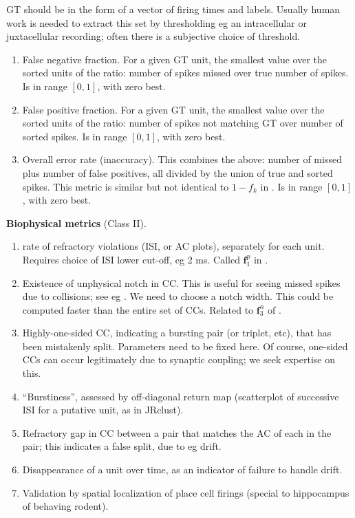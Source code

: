 \documentclass[10pt]{article}
\newcommand{\ben}{\begin{enumerate}}
\newcommand{\een}{\end{enumerate}}
\newcommand{\mbf}[1]{{\mathbf #1}}
\begin{document}
  GT should be in the form of a vector of firing times and labels. Usually
    human work is needed to extract this set by thresholding eg an intracellular or juxtacellular recording; often there is a subjective choice of threshold.
  
  \ben
\item False negative fraction.
  For a given GT unit, the smallest value over the
  sorted units of the ratio: number of spikes missed over true number of spikes.
  Is in range $[0,1]$, with zero best.
  
\item False positive fraction. 
For a given GT unit, the smallest value over the
sorted units of the ratio: number of spikes not matching GT over number of sorted spikes.
  Is in range $[0,1]$, with zero best.

\item Overall error rate (inaccuracy).
  This combines the above: number of missed plus number
  of false positives, all divided by the union of true and sorted spikes.
  This metric is similar but not identical to $1-f_k$ in \cite{validspike}.
  Is in range $[0,1]$, with zero best.

  \een
\item {\bf Biophysical metrics} (Class II).
  \ben
\item rate of refractory violations (ISI, or AC plots),
  separately for each unit. Requires choice of ISI lower cut-off, eg 2 ms.
  Called $\mbf{f}_1^p$ in \cite{Hill2011}.
\item Existence of unphysical notch in CC. This is useful
  for seeing missed spikes due to collisions; see eg \cite{chaitu}.
  We need to choose a notch width. This could be computed faster than
  the entire set of CCs. Related to $\mbf{f}_3^n$ of \cite{Hill2011}.
\item Highly-one-sided CC, indicating a bursting pair (or triplet, etc),
  that has been mistakenly split. Parameters need to be fixed here.
  Of course, one-sided CCs can occur legitimately due to synaptic coupling;
  we seek expertise on this.
\item ``Burstiness'', assessed by off-diagonal return map
  (scatterplot of successive ISI for a putative unit, as in JRclust).
\item Refractory gap in CC between a pair that matches the AC of each in the pair; this indicates a false split, due to eg drift.
\item Disappearance of a unit over time, as an indicator of failure
  to handle drift.
\item
  Validation by spatial localization of place cell
  firings \cite{mountainsort} (special to hippocampus of behaving rodent).
\een
  
\end{document}
